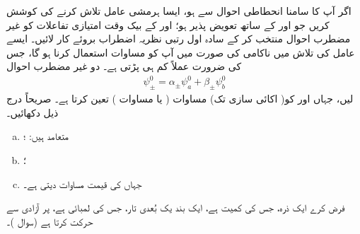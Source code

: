  اگر آپ کا سامنا انحطاطی احوال سے ہو، ایسا ہرمشی عامل  تلاش کرنے کی کوشش کریں جو  اور  کے ساتھ  تعویض پذیر  ہو؛  اور  کے بیک وقت امتیازی تفاعلات کو غیر مضطرب احوال منتخب کر کے سادہ اول رتبی نظریہ اضطراب بروئے کار لائیں۔ ایسے عامل کی تلاش میں ناکامی کی صورت میں آپ کو مساوات  استعمال کرنا ہو گا، جس کی ضرورت عملاً کم ہی پڑتی ہے۔
 دو غیر مضطرب احوال
\begin{align*}
\psi_\pm^0 = \alpha_\pm \psi_a^0 + \beta_\pm \psi_b^0
\end{align*}
لیں، جہاں  اور  کو( اکائی سازی تک) مساوات  ( یا مساوات ) تعین کرتا ہے۔ صریحاً درج ذیل دکھائیں۔
\begin{enumerate}[a.]
\item
{} متعامد ہیں: ؛
\item
{}؛
\item
{} جہاں  کی قیمت مساوات  دیتی ہے۔ 
\end{enumerate}
فرض کرے ایک ذرہ، جس کی کمیت  ہے، ایک بند یک بُعدی تار، جس کی لمبائی  ہے، پر آزادی سے حرکت کرتا ہے (سوال )۔ 
